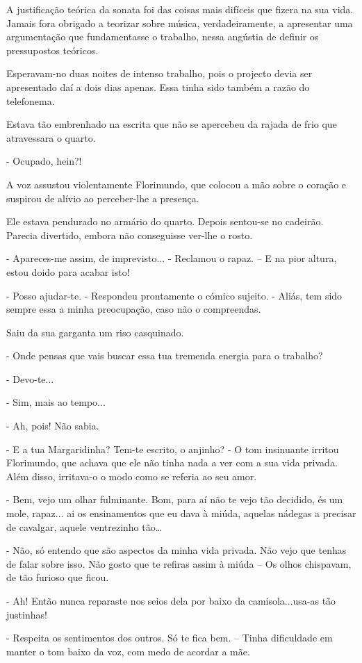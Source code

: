 A justificação teórica da sonata foi das coisas mais difíceis que fizera
na sua vida. Jamais fora obrigado a teorizar sobre música,
verdadeiramente, a apresentar uma argumentação que fundamentasse o
trabalho, nessa angústia de definir os pressupostos teóricos.

Esperavam-no duas noites de intenso trabalho, pois o projecto devia ser
apresentado daí a dois dias apenas. Essa tinha sido também a razão do
telefonema.

Estava tão embrenhado na escrita que não se apercebeu da rajada de frio
que atravessara o quarto.

- Ocupado, hein?!

A voz assustou violentamente Florimundo, que colocou a mão sobre o
coração e suspirou de alívio ao perceber-lhe a presença.

Ele estava pendurado no armário do quarto. Depois sentou-se no cadeirão.
Parecia divertido, embora não conseguisse ver-lhe o rosto.

- Apareces-me assim, de imprevisto... - Reclamou o rapaz. -- E na pior
altura, estou doido para acabar isto!

- Posso ajudar-te. - Respondeu prontamente o cómico sujeito. - Aliás,
tem sido sempre essa a minha preocupação, caso não o compreendas.

Saiu da sua garganta um riso casquinado.

- Onde pensas que vais buscar essa tua tremenda energia para o trabalho?

- Devo-te...

- Sim, mais ao tempo...

- Ah, pois! Não sabia.

- E a tua Margaridinha? Tem-te escrito, o anjinho? - O tom insinuante
irritou Florimundo, que achava que ele não tinha nada a ver com a sua
vida privada. Além disso, irritava-o o modo como se referia ao seu amor.

- Bem, vejo um olhar fulminante. Bom, para aí não te vejo tão decidido,
és um mole, rapaz... ai os ensinamentos que eu dava à miúda, aquelas
nádegas a precisar de cavalgar, aquele ventrezinho tão\ldots{}

- Não, só entendo que são aspectos da minha vida privada. Não vejo que
tenhas de falar sobre isso. Não gosto que te refiras assim à miúda -- Os
olhos chispavam, de tão furioso que ficou.

- Ah! Então nunca reparaste nos seios dela por baixo da
camisola...usa-as tão justinhas!

- Respeita os sentimentos dos outros. Só te fica bem. -- Tinha
dificuldade em manter o tom baixo da voz, com medo de acordar a mãe.


